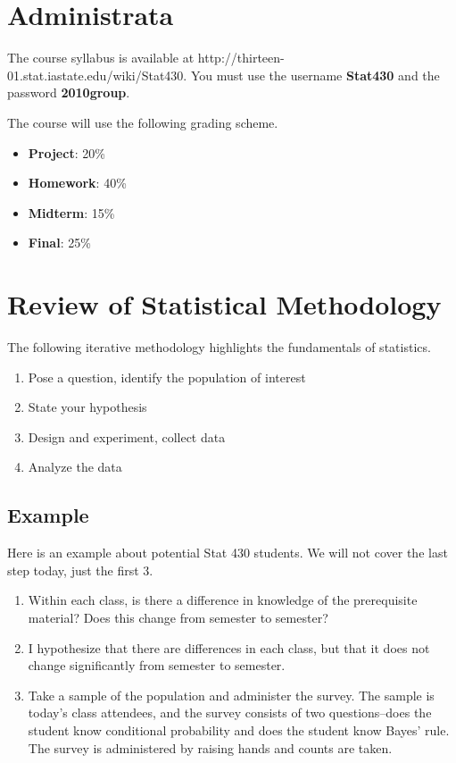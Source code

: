 \documentclass[10pt]{article}
\newenvironment{mitemize}
{
  \begin{itemize}
  \setlength{\itemsep}{1pt}
  \setlength{\parskip}{0pt}
  \setlength{\parsep}{0pt}}{\end{itemize}
}
\newenvironment{menumerate}
{
  \begin{enumerate}
  \setlength{\itemsep}{1pt}
  \setlength{\parskip}{0pt}
  \setlength{\parsep}{0pt}}{\end{enumerate}
}
\begin{document}
\section*{Administrata}
The course syllabus is available at http://thirteen-01.stat.iastate.edu/wiki/Stat430. You must use the username \textbf{Stat430} and the password \textbf{2010group}.

The course will use the following grading scheme.
\begin{mitemize}
\item \textbf{Project}: 20\%
\item \textbf{Homework}: 40\%
\item \textbf{Midterm}: 15\%
\item \textbf{Final}: 25\%
\end{mitemize}

\section*{Review of Statistical Methodology}
The following iterative methodology highlights the fundamentals of statistics.
\begin{menumerate}
\item Pose a question, identify the population of interest
\item State your hypothesis
\item Design and experiment, collect data
\item Analyze the data
\end{menumerate}

\subsection*{Example}
Here is an example about potential Stat 430 students. We will not cover the last step today, just the first 3.
\begin{menumerate}
\item Within each class, is there a difference in knowledge of the prerequisite material? Does this change from semester to semester?
\item I hypothesize that there are differences in each class, but that it does not change significantly from semester to semester.
\item Take a sample of the population and administer the survey. The sample is today's class attendees, and the survey consists of two questions--does the student know conditional probability and does the student know Bayes' rule. The survey is administered by raising hands and counts are taken.
\end{menumerate}
\end{document}
